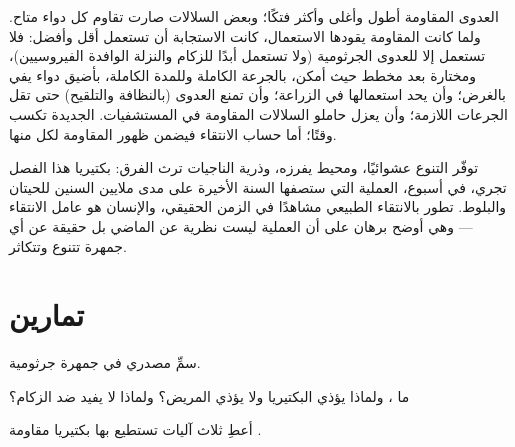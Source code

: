 \begin{proposition}\label{prop:g11:antibiotic-resistance:consequences}
العدوى المقاومة أطول وأغلى وأكثر فتكًا؛ وبعض السلالات صارت تقاوم كل
دواء متاح. ولما كانت المقاومة يقودها الاستعمال، كانت الاستجابة أن تستعمل
 أقل وأفضل: فلا تستعمل إلا للعدوى الجرثومية (ولا تستعمل
أبدًا للزكام والنزلة الوافدة الفيروسيين)، ومختارة بعد مخطط  حيث أمكن، بالجرعة الكاملة وللمدة الكاملة، بأضيق دواء يفي
بالغرض؛ وأن يحد استعمالها في الزراعة؛ وأن تمنع العدوى (بالنظافة
والتلقيح) حتى تقل الجرعات اللازمة؛ وأن يعزل حاملو السلالات المقاومة في
المستشفيات.  الجديدة تكسب وقتًا؛ أما حساب الانتقاء
فيضمن ظهور المقاومة لكل منها.
\end{proposition}
\admitted

\begin{remark}\label{rem:g11:antibiotic-resistance:evolution}
 توفّر التنوع عشوائيًا، ومحيط يفرزه، وذرية الناجيات ترث الفرق:
بكتيريا هذا الفصل تجري، في أسبوع، العملية التي ستصفها السنة الأخيرة
على مدى ملايين السنين للحيتان والبلوط.  تطور
بالانتقاء الطبيعي مشاهدًا في الزمن الحقيقي، والإنسان هو عامل الانتقاء
--- وهي أوضح برهان على أن العملية ليست نظرية عن الماضي بل حقيقة عن أي
جمهرة تتنوع وتتكاثر.
\end{remark}

\section{تمارين}

\begin{exercise}[$\star$]\label{exo:g11:antibiotic-resistance:1}
سمِّ مصدري  في جمهرة جرثومية.
\end{exercise}

\begin{exercise}[$\star$]\label{exo:g11:antibiotic-resistance:2}
ما ، ولماذا يؤذي البكتيريا ولا يؤذي  المريض؟ ولماذا
لا يفيد ضد الزكام؟
\end{exercise}

\begin{exercise}[$\star$]\label{exo:g11:antibiotic-resistance:3}
أعطِ ثلاث آليات تستطيع بها بكتيريا مقاومة .
\end{exercise}

